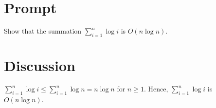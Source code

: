 \documentclass[11pt]{article}
\begin{document}
    \section{Prompt}

Show that the summation $\sum^n_{i=1} \log i$ is $O(n\log n)$.

    \pagebreak

    \section{Discussion}

$\sum^n_{i=1} \log i \leq \sum^n_{i=1} \log n = n \log n$ for $n \geq 1$. Hence, $\sum^n_{i=1} \log i$ is $O(n\log n)$.
\end{document}
